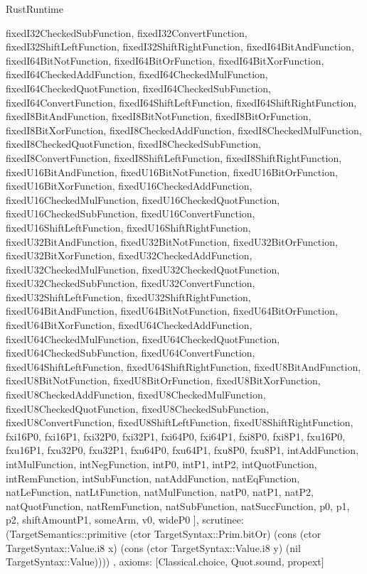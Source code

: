 \begin{lexlean}{RustRuntime}
\begin{semanticmodule}
{{      fixedI32CheckedSubFunction,
      fixedI32ConvertFunction,
      fixedI32ShiftLeftFunction,
      fixedI32ShiftRightFunction,
      fixedI64BitAndFunction,
      fixedI64BitNotFunction,
      fixedI64BitOrFunction,
      fixedI64BitXorFunction,
      fixedI64CheckedAddFunction,
      fixedI64CheckedMulFunction,
      fixedI64CheckedQuotFunction,
      fixedI64CheckedSubFunction,
      fixedI64ConvertFunction,
      fixedI64ShiftLeftFunction,
      fixedI64ShiftRightFunction,
      fixedI8BitAndFunction,
      fixedI8BitNotFunction,
      fixedI8BitOrFunction,
      fixedI8BitXorFunction,
      fixedI8CheckedAddFunction,
      fixedI8CheckedMulFunction,
      fixedI8CheckedQuotFunction,
      fixedI8CheckedSubFunction,
      fixedI8ConvertFunction,
      fixedI8ShiftLeftFunction,
      fixedI8ShiftRightFunction,
      fixedU16BitAndFunction,
      fixedU16BitNotFunction,
      fixedU16BitOrFunction,
      fixedU16BitXorFunction,
      fixedU16CheckedAddFunction,
      fixedU16CheckedMulFunction,
      fixedU16CheckedQuotFunction,
      fixedU16CheckedSubFunction,
      fixedU16ConvertFunction,
      fixedU16ShiftLeftFunction,
      fixedU16ShiftRightFunction,
      fixedU32BitAndFunction,
      fixedU32BitNotFunction,
      fixedU32BitOrFunction,
      fixedU32BitXorFunction,
      fixedU32CheckedAddFunction,
      fixedU32CheckedMulFunction,
      fixedU32CheckedQuotFunction,
      fixedU32CheckedSubFunction,
      fixedU32ConvertFunction,
      fixedU32ShiftLeftFunction,
      fixedU32ShiftRightFunction,
      fixedU64BitAndFunction,
      fixedU64BitNotFunction,
      fixedU64BitOrFunction,
      fixedU64BitXorFunction,
      fixedU64CheckedAddFunction,
      fixedU64CheckedMulFunction,
      fixedU64CheckedQuotFunction,
      fixedU64CheckedSubFunction,
      fixedU64ConvertFunction,
      fixedU64ShiftLeftFunction,
      fixedU64ShiftRightFunction,
      fixedU8BitAndFunction,
      fixedU8BitNotFunction,
      fixedU8BitOrFunction,
      fixedU8BitXorFunction,
      fixedU8CheckedAddFunction,
      fixedU8CheckedMulFunction,
      fixedU8CheckedQuotFunction,
      fixedU8CheckedSubFunction,
      fixedU8ConvertFunction,
      fixedU8ShiftLeftFunction,
      fixedU8ShiftRightFunction,
      fxi16P0,
      fxi16P1,
      fxi32P0,
      fxi32P1,
      fxi64P0,
      fxi64P1,
      fxi8P0,
      fxi8P1,
      fxu16P0,
      fxu16P1,
      fxu32P0,
      fxu32P1,
      fxu64P0,
      fxu64P1,
      fxu8P0,
      fxu8P1,
      intAddFunction,
      intMulFunction,
      intNegFunction,
      intP0,
      intP1,
      intP2,
      intQuotFunction,
      intRemFunction,
      intSubFunction,
      natAddFunction,
      natEqFunction,
      natLeFunction,
      natLtFunction,
      natMulFunction,
      natP0,
      natP1,
      natP2,
      natQuotFunction,
      natRemFunction,
      natSubFunction,
      natSuccFunction,
      p0,
      p1,
      p2,
      shiftAmountP1,
      someArm,
      v0,
      wideP0
    ],
    scrutinee: (TargetSemantics::primitive (ctor TargetSyntax::Prim.bitOr) (cons (ctor TargetSyntax::Value.i8 x) (cons (ctor TargetSyntax::Value.i8 y) (nil TargetSyntax::Value))))
  },
  axioms: [Classical.choice, Quot.sound, propext]
}


\end{semanticmodule}
\end{lexlean}
